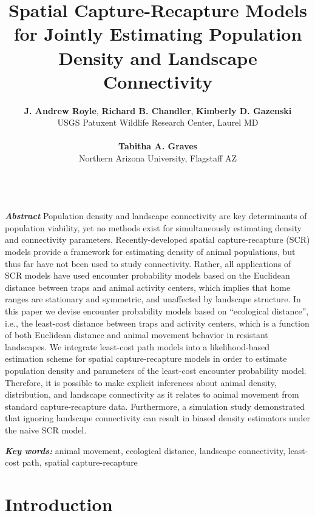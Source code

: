 \documentclass[12pt]{article}
\title{Spatial Capture-Recapture Models for
Jointly Estimating Population Density and
Landscape Connectivity}
\author{
{\bf J. Andrew Royle}, {\bf Richard B. Chandler},
{\bf Kimberly D. Gazenski} \\
USGS Patuxent Wildlife Research Center, Laurel MD \\ \\
{\bf Tabitha A. Graves} \\
Northern Arizona University, Flagstaff AZ \\ \\
}
\begin{document}
\maketitle

\date


\linenumbers


\begin{spacing}{1.8}

\begin{flushleft}
{\em \bf Abstract}
Population density and landscape connectivity are key determinants of
population viability, yet no methods exist for
simultaneously estimating density and connectivity parameters.
Recently-developed spatial capture-recapture (SCR) models
provide a framework for estimating density of animal populations,
but thus far have not been used to study connectivity.  Rather, all
applications of SCR models have used encounter probability models
based on the Euclidean distance between traps and animal activity
centers, which implies that home ranges are stationary and
symmetric, and unaffected by landscape %
structure. In this paper we devise encounter probability models based
on ``ecological distance'', i.e., the least-cost distance between
traps and activity centers, which is a function of both Euclidean
distance and animal movement behavior in %
resistant landscapes. We
integrate least-cost path models into a likelihood-based estimation
scheme for spatial capture-recapture models in order to estimate
population density and parameters of the least-cost encounter
probability model.  Therefore, it is possible to make explicit
inferences about animal density, distribution, and landscape
connectivity as it relates to animal movement from standard
capture-recapture data.  Furthermore, a simulation study demonstrated
that ignoring landscape connectivity can result in biased density
estimators under the naive SCR model. %

{\em \bf Key words:} animal movement, ecological distance, landscape connectivity,
least-cost path, spatial capture-recapture

\end{flushleft}



\section{Introduction}


\end{spacing}
\end{document}
